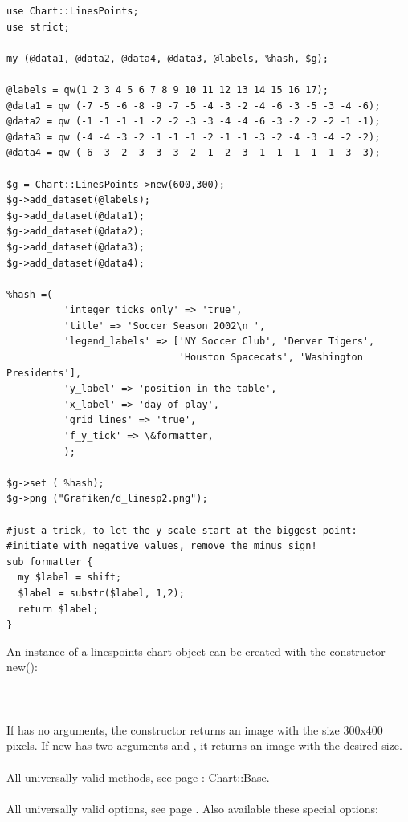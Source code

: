 \begin{verbatim}
use Chart::LinesPoints;
use strict;

my (@data1, @data2, @data4, @data3, @labels, %hash, $g);

@labels = qw(1 2 3 4 5 6 7 8 9 10 11 12 13 14 15 16 17);
@data1 = qw (-7 -5 -6 -8 -9 -7 -5 -4 -3 -2 -4 -6 -3 -5 -3 -4 -6);
@data2 = qw (-1 -1 -1 -1 -2 -2 -3 -3 -4 -4 -6 -3 -2 -2 -2 -1 -1);
@data3 = qw (-4 -4 -3 -2 -1 -1 -1 -2 -1 -1 -3 -2 -4 -3 -4 -2 -2);
@data4 = qw (-6 -3 -2 -3 -3 -3 -2 -1 -2 -3 -1 -1 -1 -1 -1 -3 -3);

$g = Chart::LinesPoints->new(600,300);
$g->add_dataset(@labels);
$g->add_dataset(@data1);
$g->add_dataset(@data2);
$g->add_dataset(@data3);
$g->add_dataset(@data4);

%hash =(
          'integer_ticks_only' => 'true',
          'title' => 'Soccer Season 2002\n ',
          'legend_labels' => ['NY Soccer Club', 'Denver Tigers',
                              'Houston Spacecats', 'Washington Presidents'],
          'y_label' => 'position in the table',
          'x_label' => 'day of play',
          'grid_lines' => 'true',
          'f_y_tick' => \&formatter,
          );

$g->set ( %hash);
$g->png ("Grafiken/d_linesp2.png");

#just a trick, to let the y scale start at the biggest point:
#initiate with negative values, remove the minus sign!
sub formatter {
  my $label = shift;
  $label = substr($label, 1,2);
  return $label;
}

\end{verbatim}
 An instance of a linespoints chart object can be created with the constructor new():\\
\\
\\
\\
If  has no arguments, the constructor returns an image with the size 300x400 pixels. If new has two arguments  and , it returns an image with the desired size. \\ 
\\ 
All universally valid methods, see page \pageref{methods}: Chart::Base. \\
\\
 All universally valid options, see page \pageref{options}. Also available these special options:
